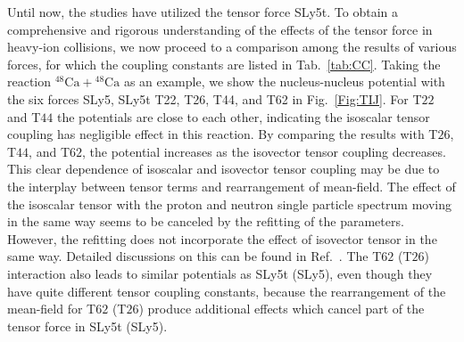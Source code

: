 Until now, the studies have utilized the tensor force SLy5t.
To obtain a comprehensive and rigorous understanding of the effects of the tensor force in heavy-ion collisions,
we now proceed to a comparison among the results of various forces, for which the coupling constants
are listed in Tab.~\ref{tab:CC}. Taking the reaction $^{48}\mathrm{Ca}+\mathrm{^{48}Ca}$ as an example,
we show the nucleus-nucleus potential with the six forces SLy5, SLy5t T22, T26, T44, and T62 in Fig.~\ref{Fig:TIJ}.
For T$22$ and T$44$ the potentials are close to each other, indicating the isoscalar tensor coupling has
negligible effect in this reaction. By comparing the results with T$26$, T$44$, and T$62$, the potential increases as the isovector tensor
coupling decreases. This clear dependence of isoscalar and isovector tensor coupling may be due to the interplay between tensor terms
and rearrangement of mean-field. The effect of the isoscalar tensor with the proton and neutron single particle spectrum moving
in the same way seems to be canceled by the refitting of the parameters.
However, the refitting does not incorporate the effect of isovector tensor in the same way.
Detailed discussions on this can be found in Ref.~\citep{Guo2018_PLB782-401}.
The T$62$ (T$26$) interaction also leads to similar potentials as SLy5t (SLy5), even though they have quite different tensor coupling constants,
because the rearrangement of the mean-field for T$62$ (T$26$)
produce additional effects which cancel part of the tensor force in SLy5t (SLy5).
